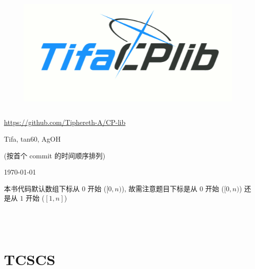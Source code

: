 \documentclass[10pt]{ICPCnotebook}
\begin{document}
\begin{titlepage}
    \vspace*{3cm}
    \begin{figure}[H]
        \centering
        \includegraphics[height=6cm]{img/cplib-logo-ba-style.png}
    \end{figure}

    \vspace*{6cm}
    \begin{center}
        \large \url{https://github.com/Tiphereth-A/CP-lib}
    \end{center}

    \vspace*{0.3cm}
    \begin{center}
        Tifa, tan60, AgOH
    \end{center}
    \begin{center}
        (按首个 commit 的时间顺序排列)
    \end{center}

    \vspace*{0.2cm}
    \begin{center}
        \today
    \end{center}
\end{titlepage}

\pagestyle{plain}


本书代码默认数组下标从 \(0\) 开始 (\([0, n)\)), 故需注意题目下标是从 \(0\) 开始 (\([0, n)\)) 还是从 \(1\) 开始 (\([1, n]\))

\inputminted{cpp}{src/src/main.cpp}

\inputminted{cpp}{src/src/test.cpp}

\inputminted{yaml}{src/src/.clang-format}

\inputminted{bash}{src/src/run.sh}

\newpage
\begin{multicols}{2}
    \tableofcontents
\end{multicols}

\newpage
\pagestyle{fancy}
\setcounter{page}{1}




\section{TCSCS}
\label{sec:theoretical-computer-science-cheat-sheet}





\end{document}
